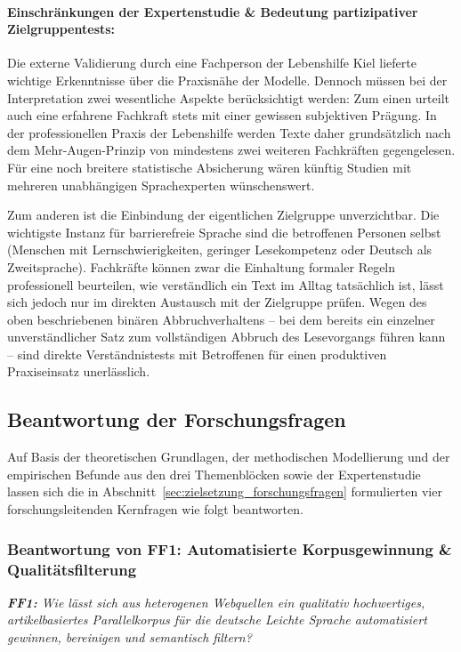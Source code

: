 \paragraph{Einschränkungen der Expertenstudie \& Bedeutung partizipativer Zielgruppentests:}
Die externe Validierung durch eine Fachperson der Lebenshilfe Kiel lieferte wichtige Erkenntnisse über die Praxisnähe der Modelle. Dennoch müssen bei der Interpretation zwei wesentliche Aspekte berücksichtigt werden: Zum einen urteilt auch eine erfahrene Fachkraft stets mit einer gewissen subjektiven Prägung. In der professionellen Praxis der Lebenshilfe werden Texte daher grundsätzlich nach dem Mehr-Augen-Prinzip von mindestens zwei weiteren Fachkräften gegengelesen. Für eine noch breitere statistische Absicherung wären künftig Studien mit mehreren unabhängigen Sprachexperten wünschenswert.

Zum anderen ist die Einbindung der eigentlichen Zielgruppe unverzichtbar. Die wichtigste Instanz für barrierefreie Sprache sind die betroffenen Personen selbst (Menschen mit Lernschwierigkeiten, geringer Lesekompetenz oder Deutsch als Zweitsprache). Fachkräfte können zwar die Einhaltung formaler Regeln professionell beurteilen, wie verständlich ein Text im Alltag tatsächlich ist, lässt sich jedoch nur im direkten Austausch mit der Zielgruppe prüfen. Wegen des oben beschriebenen binären Abbruchverhaltens – bei dem bereits ein einzelner unverständlicher Satz zum vollständigen Abbruch des Lesevorgangs führen kann – sind direkte Verständnistests mit Betroffenen für einen produktiven Praxiseinsatz unerlässlich.

\subsection{Beantwortung der Forschungsfragen}
\label{sec:diskussion_forschungsfragen}

Auf Basis der theoretischen Grundlagen, der methodischen Modellierung und der empirischen Befunde aus den drei Themenblöcken sowie der Expertenstudie lassen sich die in Abschnitt~\ref{sec:zielsetzung_forschungsfragen} formulierten vier forschungsleitenden Kernfragen wie folgt beantworten.

\subsubsection{Beantwortung von FF1: Automatisierte Korpusgewinnung \& Qualitätsfilterung}

\begin{tcolorbox}[boxrule=0pt,sharp corners,enhanced,borderline west={2pt}{0pt}{blue}]
    \textit{\textbf{FF1:} Wie lässt sich aus heterogenen Webquellen ein qualitativ hochwertiges, artikelbasiertes Parallelkorpus für die deutsche Leichte Sprache automatisiert gewinnen, bereinigen und semantisch filtern?}
\end{tcolorbox}


